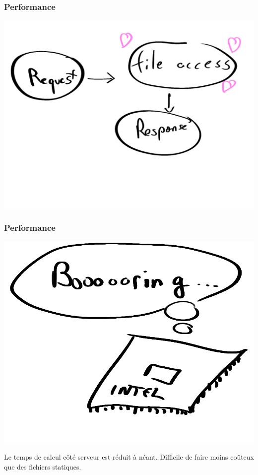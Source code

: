 \documentclass[frenchb,francais]{beamer}
\begin{document}
\begin{frame}
    \frametitle{Performance}
    \begin{center}\includegraphics[scale=.17]{img/pelican-flow.png}\end{center}
\end{frame}

\begin{frame}
    \frametitle{Performance}
    \begin{center}\includegraphics[scale=.15]{img/boring.png}\end{center}
    Le temps de calcul côté serveur est réduit à néant. Difficile de faire moins
    coûteux que des fichiers statiques.
\end{frame}
\end{document}
